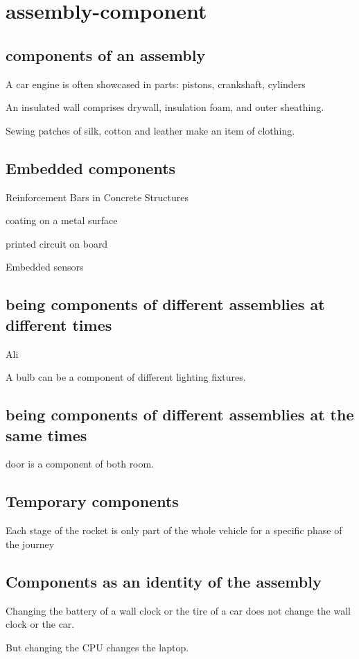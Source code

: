 \chapter{assembly-component}

\section{components of an assembly}

A car engine is often showcased in parts: pistons, crankshaft, cylinders

An insulated wall comprises drywall, insulation foam, and outer sheathing.

Sewing patches of silk, cotton and leather make an item of clothing.

\section{Embedded components}

Reinforcement Bars in Concrete Structures

coating on a metal surface

printed circuit on board

Embedded sensors

\section{being components of different assemblies at different times}

Ali

A bulb can be a component of different lighting fixtures.

\section{being components of different assemblies at the same times}

door is a component of both room.

\section{Temporary components}

Each stage of the rocket is only part of the whole vehicle for a specific phase of the journey

\section {Components as an identity of the assembly}

Changing the battery of a wall clock or the tire of a car does not change the wall clock or the car.

But changing the CPU changes the laptop. 








